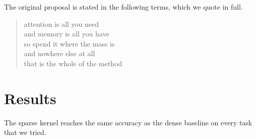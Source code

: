 \documentclass[10pt]{article}
\newcommand{\s}[1]{#1}
\newcommand{\sn}[1]{}
\begin{document}
\s{The original proposal is stated in the following terms, which we quote in full.}

\sn{attention is all you need and memory is all you have so spend it where the mass is and nowhere else at all that is the whole of the method}
{\small
\begin{quote}
attention is all you need\\
and memory is all you have\\
so spend it where the mass is\\
and nowhere else at all\\
that is the whole of the method
\end{quote}
}

\section{Results}

\s{The sparse kernel reaches the same accuracy as the dense baseline on every task that we tried.}
\end{document}
